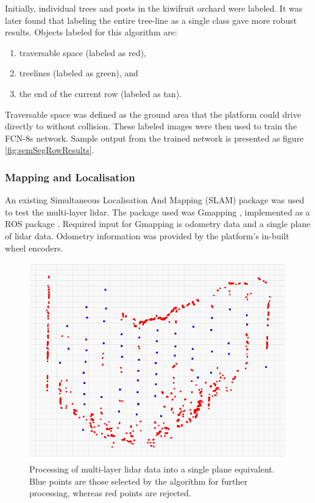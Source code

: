 \documentclass[preprint,authoryear,12pt]{elsarticle}
\begin{document}
        Initially, individual trees and posts in the kiwifruit orchard were labeled.
    	It was later found that labeling the entire tree-line as a single class gave more robust results.
    	Objects labeled for this algorithm are:
        \begin{enumerate}
        \item traversable space (labeled as red),
        \item treelines (labeled as green), and
        \item the end of the current row (labeled as tan).
        \end{enumerate}
        Traversable space was defined as the ground area that the platform could drive directly to without collision.
        These labeled images were then used to train the FCN-8s network.
    	Sample output from the trained network is presented as figure \ref{fig:semSegRowResults}.

    \subsubsection{Mapping and Localisation}
        An existing Simultaneous Localisation And Mapping (SLAM) package was used to test the multi-layer lidar.
        The package used was Gmapping \citep{Grisetti2007}, implemented as a ROS package \citep{Gerkey2010}.
    	Required input for Gmapping is odometry data and a single plane of lidar data.
        Odometry information was provided by the platform's in-built wheel encoders.

        \begin{figure}[htb]
            \centering
            \includegraphics[width=\linewidth]{imgs/single_plane_extraction/single_plane_extraction.pdf}
            \caption{
                Processing of multi-layer lidar data into a single plane equivalent.
                Blue points are those selected by the algorithm for further processing, whereas red points are rejected.
            }
            \label{fig:singlePlaneExtraction}
        \end{figure}
\end{document}
